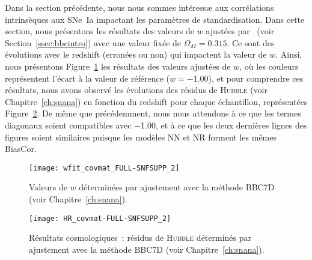 \documentclass[../main/main.tex]{subfiles}
\begin{document}
Dans la section précédente, nous nous sommes intéressæ aux corrélations
intrinsèques aux SNe~Ia impactant les paramètres de standardisation. Dans cette
section, nous présentons les résultats des valeurs de $w$ ajustées par \wfit\
(voir Section~\ref{ssec:bbcintro}) avec une valeur fixée de $\Omega_M =
\num{0.315}$. Ce sont des évolutions avec le redshift (erronées ou non) qui
impactent la valeur de $w$. Ainsi, nous présentons Figure~\ref{fig:wfit} les
résultats des valeurs ajustées de $w$, où les couleurs représentent l'écart à la
valeur de référence ($w = \num{-1.00}$), et pour comprendre ces résultats, nous
avons observé les évolutions des résidus de \textsc{Hubble} (voir
Chapitre~\ref{ch:snana}) en fonction du redshift pour chaque échantillon,
représentées Figure~\ref{fig:hr}. De même que précédemment, nous nous attendons
à ce que les termes diagonaux soient compatibles avec \num{-1.00}, et à ce que
les deux dernières lignes des figures soient similaires puisque les modèles NN
et NR forment les mêmes BiasCor.

\begin{figure}[ht]
    \centering
    \texttt{[image: wfit\_covmat\_FULL-SNFSUPP\_2]}
    \caption[Résultats cosmologiques~: $w$]{Valeurs de $w$ déterminées par
    ajustement avec la méthode BBC7D (voir Chapitre~\ref{ch:snana}).}
    \label{fig:wfit}
\end{figure}

\begin{figure}[p]
    \centering
    \texttt{[image: HR\_covmat-FULL-SNFSUPP\_2]}
    \caption[Résultats cosmologiques~: résidus de \textsc{Hubble}]{Résultats
        cosmologiques~: résidus de \textsc{Hubble} déterminés par ajustement
    avec la méthode BBC7D (voir Chapitre~\ref{ch:snana}).}
    \label{fig:hr}
\end{figure}
\end{document}
